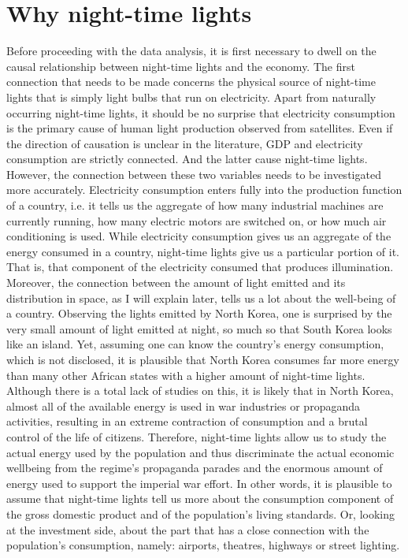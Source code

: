 \chapter{Why night-time lights}\label{ch:whynighttimelights}
Before proceeding with the data analysis, it is first necessary to dwell on the causal relationship between night-time lights and the economy. 
The first connection that needs to be made concerns the physical source of night-time lights that is simply light bulbs that run on electricity. Apart from naturally occurring night-time lights, it should be no surprise that electricity consumption is the primary cause of human light production observed from satellites.
Even if the direction of causation is unclear in the literature, GDP and electricity consumption are strictly connected. And the latter cause night-time lights. However, the connection between these two variables needs to be investigated more accurately. 
Electricity consumption enters fully into the production function of a country, i.e. it tells us the aggregate of how many industrial machines are currently running, how many electric motors are switched on, or how much air conditioning is used. While electricity consumption gives us an aggregate of the energy consumed in a country, night-time lights give us a particular portion of it. That is, that component of the electricity consumed that produces illumination. 
Moreover, the connection between the amount of light emitted and its distribution in space, as I will explain later, tells us a lot about the well-being of a country. 
Observing the lights emitted by North Korea, one is surprised by the very small amount of light emitted at night, so much so that South Korea looks like an island. Yet, assuming one can know the country's energy consumption, which is not disclosed, it is plausible that North Korea consumes far more energy than many other African states with a higher amount of night-time lights. Although there is a total lack of studies on this, it is likely that in North Korea, almost all of the available energy is used in war industries or propaganda activities, resulting in an extreme contraction of consumption and a brutal control of the life of citizens.
Therefore, night-time lights allow us to study the actual energy used by the population and thus discriminate the actual economic wellbeing from the regime's propaganda parades and the enormous amount of energy used to support the imperial war effort.
In other words, it is plausible to assume that night-time lights tell us more about the consumption component of the gross domestic product and of the population's living standards. Or, looking at the investment side, about the part that has a close connection with the population's consumption, namely: airports, theatres, highways or street lighting. 

